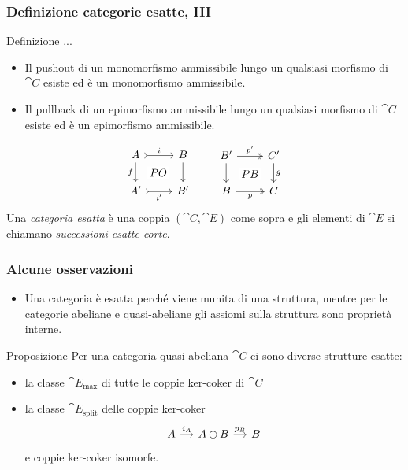 \documentclass{beamer}
\begin{document}
\begin{frame}[fragile]
  \frametitle{Definizione categorie esatte, III}

  \begin{block}{Definizione}
    ...
    \begin{itemize}
    \item \label{item:E2} Il pushout di un monomorfismo ammissibile
      lungo un qualsiasi morfismo di \(\cat C\) esiste ed è un
      monomorfismo ammissibile.
    \item \label{item:E2op} Il pullback di un epimorfismo ammissibile
      lungo un qualsiasi morfismo di \(\cat C\) esiste ed è un
      epimorfismo ammissibile.
    \end{itemize}
    \[
      \begin{tikzcd}
        A \ar["{f}", d, swap] \ar["{PO}" description, dr, phantom] \ar["{i}", rightarrowtail, r] & B \ar["{}", d] \\
        A' \ar["{i'}", rightarrowtail, r, swap] & B'
      \end{tikzcd}
      \qquad
      \begin{tikzcd}
        B' \ar["{}", d] \ar["{PB}" description, dr, phantom] \ar["{p'}", twoheadrightarrow, r] & C' \ar["{g}", d] \\
        B \ar["{p}", twoheadrightarrow, r, swap] & C
      \end{tikzcd}
    \]
    Una {\em categoria esatta} è una coppia \((\cat C,\cat E)\) come
    sopra e gli elementi di \(\cat E\) si chiamano {\em successioni
      esatte corte}.
  \end{block}
  
\end{frame}

\begin{frame}[fragile]
  \frametitle{Alcune osservazioni}

  \begin{itemize}
  \item Una categoria è esatta perché viene munita di una struttura,
    mentre per le categorie abeliane e quasi-abeliane gli assiomi sulla
    struttura sono proprietà interne.
  \end{itemize}

  \pause
  
  \begin{block}{Proposizione}
    Per una categoria quasi-abeliana \(\cat C\) ci sono diverse
    strutture esatte:
    \begin{itemize}
    \item la classe \(\cat E_{\text{max}}\) di tutte le coppie ker-coker
      di \(\cat C\)
    \item la classe \(\cat E_{\text{split}}\) delle coppie ker-coker
      \[
        \begin{tikzcd}[column sep=small]
          A \ar["{i_A}", r] & A \oplus B \ar["{p_B}", r] & B
        \end{tikzcd}
      \]
      e coppie ker-coker isomorfe.
    \end{itemize}
  \end{block}
  
\end{frame}
\end{document}

